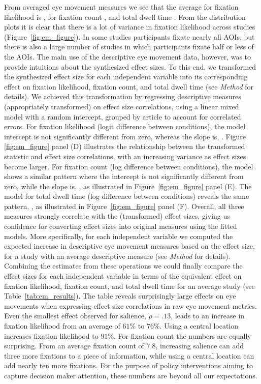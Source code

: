 From averaged eye movement measures we see that the average for fixation likelihood is \unskip, for fixation count \unskip, and total dwell time \unskip. From the distribution plots it is clear that there is a lot of variance in fixation likelihood across studies (Figure~\ref{fig:em_figure}). In some studies participants fixate nearly all AOIs, but there is also a large number of studies in which participants fixate half or less of the AOIs. The main use of the descriptive eye movement data, however, was to provide intuitions about the synthesized effect sizes. To this end, we transformed the synthesized effect size for each independent variable into its corresponding effect on fixation likelihood, fixation count, and total dwell time (see \textit{Method} for details). We achieved this transformation by regressing descriptive measures (appropriately transformed) on effect size correlations, using a linear mixed model with a random intercept, grouped by article to account for correlated errors. For fixation likelihood (logit difference between conditions), the model intercept is not significantly different from zero, whereas the slope is, \unskip. Figure \ref{fig:em_figure} panel (D) illustrates the relationship between the transformed statistic and effect size correlations, with an increasing variance as effect sizes become larger. For fixation count (log difference between conditions), the model shows a similar pattern where the intercept is not significantly different from zero, while the slope is, \unskip, as illustrated in Figure~\ref{fig:em_figure} panel (E). The model for total dwell time (log difference between conditions) reveals the same pattern, \unskip, as illustrated in Figure~\ref{fig:em_figure} panel (F). Overall, all three measures strongly correlate with the (transformed) effect sizes, giving us confidence for converting effect sizes into original measures using the fitted models. More specifically, for each independent variable we computed the expected increase in descriptive eye movement measures based on the effect size, for a study with an average descriptive measure (see \textit{Method} for details). Combining the estimates from these operations we could finally compare the effect sizes for each independent variable in terms of the equivalent effect on fixation likelihood, fixation count, and total dwell time for an average study (see Table~\ref{tab:em_results}). The table reveals surprisingly large effects on eye movements when expressing effect size correlations in raw eye movement metrics. Even the smallest effect observed for salience, $\rho = .13$, leads to an increase in fixation likelihood from an average of $61\%$ to $76\%$. Using a central location increases fixation likelihood to $91\%$. For fixation count the numbers are equally surprising. From an average fixation count of $7.8$, increasing salience can add three more fixations to a piece of information, while using a central location can add nearly ten more fixations. For the purpose of policy interventions aiming to capture decision maker attention, these numbers are beyond all our expectations.


